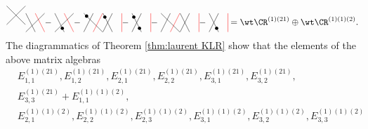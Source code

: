 \documentclass[11pt,reqno]{amsart}
\begin{document}
\begin{example}
\[{{\begin{tikzpicture}[scale=0.375]
    \draw (1,0)--(3,2);
    \draw (3,0)--(1,2);
\end{tikzpicture}}}{\hackcenter{\begin{tikzpicture}[scale=0.375]
    \draw (1,2)--(2,0);
    \draw[red] (2,2)--(3,0);
    \draw (3,2)--(1,0);
\end{tikzpicture}}}
{-\ \hackcenter{\begin{tikzpicture}[scale=0.375]
    \draw (1,2)--(2,0);
    \draw[red] (2,2)--(3,0);
    \draw (3,2)--(1,0);
    \fill (1.8,0.4) circle (5pt);
\end{tikzpicture}}}
{-\ \hackcenter{\begin{tikzpicture}[scale=0.375]
    \draw (2,2)--(1,0);
    \draw (1,2)--(3,0);
    \draw[red] (3,2)--(2,0);
    \fill (1.3,2-0.3) circle (5pt);
\end{tikzpicture}}}{\hackcenter{\begin{tikzpicture}[scale=0.375]
    \draw[red] (4,0)--(4,2);
    \draw (2,0)--(3,2);
    \draw (3,0)--(2,2);
    \fill (2.2,1.6) circle (5pt);
\end{tikzpicture}}}
{-\ \hackcenter{\begin{tikzpicture}[scale=0.375]
    \draw[red] (4,0)--(4,2);
    \draw (2,0)--(3,2);
    \draw (3,0)--(2,2);
    \fill (2.2,1.6) circle (5pt);
    \fill (2.8,0.4) circle (5pt);
\end{tikzpicture}}}
{-\ \hackcenter{\begin{tikzpicture}[scale=0.375]
    \draw (2,2)--(1,0);
    \draw (1,2)--(3,0);
    \draw[red] (3,2)--(2,0);
\end{tikzpicture}}}
{\hackcenter{\begin{tikzpicture}[scale=0.375]
    \draw[red] (4,0)--(4,2);
    \draw (2,0)--(3,2);
    \draw (3,0)--(2,2);
\end{tikzpicture}}}
{-\ \hackcenter{\begin{tikzpicture}[scale=0.375]
    \draw[red] (4,0)--(4,2);
    \draw (2,0)--(3,2);
    \draw (3,0)--(2,2);
    \fill (2.8,0.4) circle (5pt);
\end{tikzpicture}}}=\wt\CR^{(1)(21)}\oplus\wt\CR^{(1)(1)(2)}.\]
    The diagrammatics of Theorem \ref{thm:laurent KLR} show that the elements of the above matrix algebras
    \begin{align*}
        &E_{1,1}^{(1)(21)},E_{1,2}^{(1)(21)},E_{2,1}^{(1)(21)},E_{2,2}^{(1)(21)},E_{3,1}^{(1)(21)},E_{3,2}^{(1)(21)},\\
        &E_{3,3}^{(1)(21)}+E_{1,1}^{(1)(1)(2)},\\
        &E_{2,1}^{(1)(1)(2)},E_{2,2}^{(1)(1)(2)},E_{2,3}^{(1)(1)(2)},E_{3,1}^{(1)(1)(2)},E_{3,2}^{(1)(1)(2)},E_{3,3}^{(1)(1)(2)}

\end{align*}
\end{example}
\end{document}
